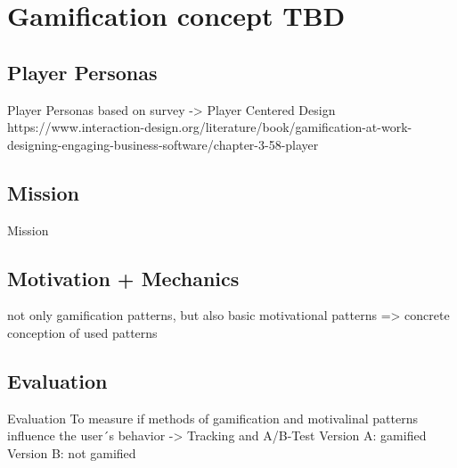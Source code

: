 
\section{Gamification concept TBD}
\label{sec:domainC}

\subsection{Player Personas}
\label{sec:domainCa}
Player Personas based on survey -> Player Centered Design
https://www.interaction-design.org/literature/book/gamification-at-work-designing-engaging-business-software/chapter-3-58-player

\subsection{Mission}
\label{sec:domainCb}
Mission

\subsection{Motivation + Mechanics}
\label{sec:domainCc}
not only gamification patterns, but also basic motivational patterns => concrete conception of used patterns

\subsection{Evaluation}
\label{sec:domainCd}
Evaluation
To measure if methods of gamification and motivalinal patterns influence the user´s behavior -> Tracking and A/B-Test
Version A: gamified
Version B: not gamified